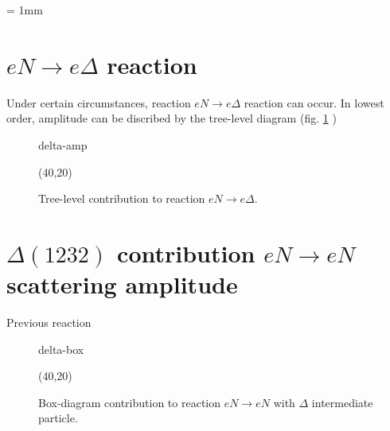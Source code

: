 \documentclass{article}
\begin{document}
	\unitlength = 1mm
\section{ $eN \to e\Delta$ reaction}
	Under certain circumstances, reaction $eN \to e\Delta$ reaction
	can occur. In lowest order, amplitude can be discribed by the
	tree-level diagram (fig. \ref{fig:delta-amp} )
	\begin{figure} \centering \label{fig:delta-amp}
	\begin{fmffile}{delta-amp}
		\begin{fmfgraph*}(40,20)
		\end{fmfgraph*}
	\end{fmffile}
	\caption{Tree-level contribution to reaction $eN \to e\Delta$.}
	\end{figure}
	
	
\section{$\Delta(1232)$ contribution $e N \to e N$ scattering amplitude}
	Previous reaction
	\begin{figure} \centering
	\begin{fmffile}{delta-box}
		\begin{fmfgraph*}(40,20)
		\end{fmfgraph*}
	\end{fmffile}
	\caption{Box-diagram contribution to reaction $eN \to eN$ with %
		$\Delta$ intermediate particle.}
	\end{figure}
	
\end{document}
